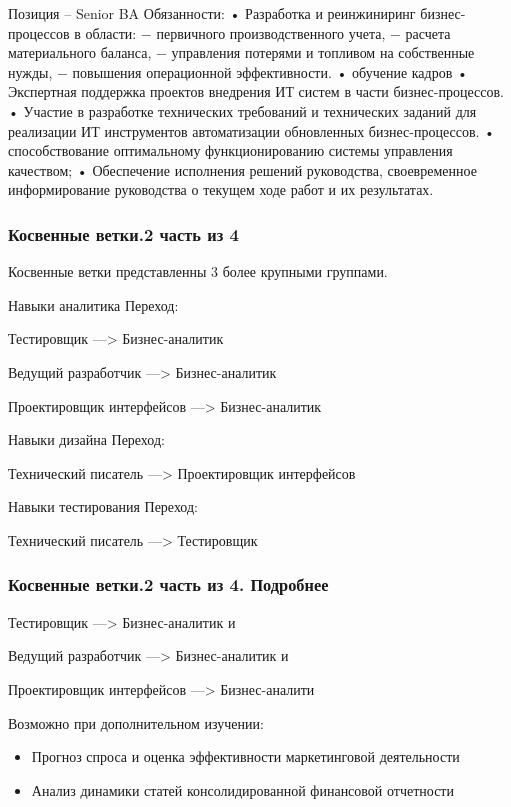 \documentclass{../industrial-development}
\begin{document}
\lecturenotes
Позиция – Senior BA
Обязанности:
•	Разработка и реинжиниринг бизнес-процессов в области:
− первичного производственного учета,
− расчета материального баланса,
− управления потерями и топливом на собственные нужды,
− повышения операционной эффективности.
•         обучение кадров
•	Экспертная поддержка проектов внедрения ИТ систем в части бизнес-процессов.
•	Участие в разработке технических требований и технических заданий для реализации ИТ инструментов автоматизации обновленных бизнес-процессов.  
•	способствование оптимальному функционированию системы управления качеством;
•	Обеспечение исполнения решений руководства, своевременное информирование руководства о текущем ходе работ и их результатах.






\begin{frame} \frametitle{Косвенные ветки.2 часть из 4}
 \begin{block}{}
Косвенные ветки представленны 3 более крупными группами.
  \end{block}
  
\begin{block}{}
 \alert{Навыки аналитика} Переход: 

Тестировщик ---> Бизнес-аналитик

Ведущий разработчик ---> Бизнес-аналитик

Проектировщик интерфейсов ---> Бизнес-аналитик
  \end{block}

 \begin{block}{}
 \alert{Навыки дизайна} Переход: 

Технический писатель ---> Проектировщик интерфейсов
  \end{block}

\begin{block}{}
 \alert{Навыки тестирования} Переход: 

Технический писатель ---> Тестировщик
  \end{block}
\end{frame}


\begin{frame} \frametitle{Косвенные ветки.2 часть из 4. Подробнее}

\begin{block}{Тестировщик ---> Бизнес-аналитик  и

Ведущий разработчик ---> Бизнес-аналитик  и

Проектировщик интерфейсов ---> Бизнес-аналити}

Возможно при дополнительном изучении:
  \end{block}
\begin{itemize}
   аналитических материалов, аналитических записок по деятельности компании
  \item Прогноз спроса и оценка эффективности маркетинговой деятельности
\item Анализ динамики статей консолидированной финансовой отчетности
  \end{itemize}
\end{frame}
\end{document}
